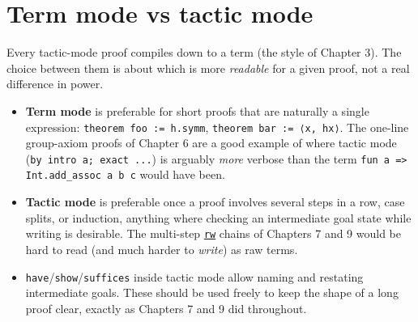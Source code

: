 \section{Term mode vs tactic mode}\label{sec:12-working-efficiently:04-term-vs-tactic-mode:1}

Every tactic-mode proof compiles down to a term (the style of Chapter 3). The choice between them is about which is more \emph{readable} for a given proof, not a real difference in power.

\begin{itemize}
\tightlist
\item
  \textbf{Term mode} is preferable for short proofs that are naturally a single expression: \texttt{theorem foo := h.symm}, \texttt{theorem bar := ⟨x, hx⟩}. The one-line group-axiom proofs of Chapter 6 are a good example of where tactic mode (\texttt{by intro a; exact ...}) is arguably \emph{more} verbose than the term \texttt{fun a => Int.add\_\allowbreak{}assoc a b c} would have been.
\item
  \textbf{Tactic mode} is preferable once a proof involves several steps in a row, case splits, or induction, anything where checking an intermediate goal state while writing is desirable. The multi-step \href{https://lean-lang.org/doc/reference/latest/Tactic-Proofs/Tactic-Reference/}{\texttt{rw}} chains of Chapters 7 and 9 would be hard to read (and much harder to \emph{write}) as raw terms.
\item
  \texttt{have}/\texttt{show}/\texttt{suffices} inside tactic mode allow naming and restating intermediate goals. These should be used freely to keep the shape of a long proof clear, exactly as Chapters 7 and 9 did throughout.
\end{itemize}
